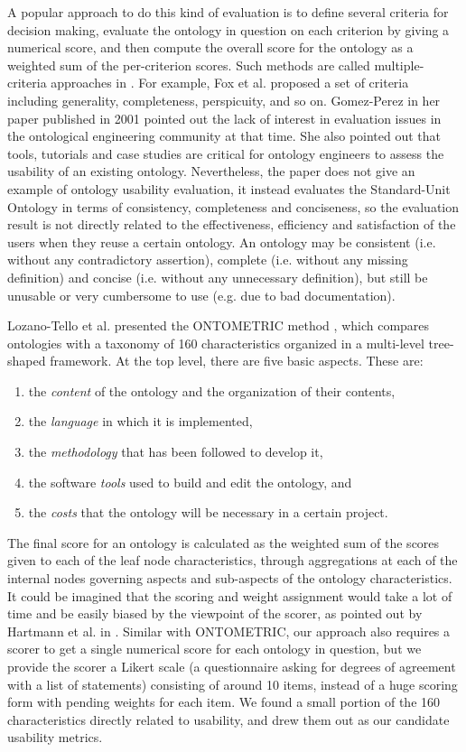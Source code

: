 A popular approach to do this kind of evaluation is to define several criteria for decision making, evaluate the ontology in question on each criterion by giving a numerical score, and then compute the overall score for the ontology as a weighted sum of the per-criterion scores. Such methods are called multiple-criteria approaches in \cite{brank2005survey}. For example, Fox et al. \cite{fox1995organisation} proposed a set of criteria including generality, completeness, perspicuity, and so on. Gomez-Perez in her paper \cite{gomez2001evaluation} published in 2001 pointed out the lack of interest in evaluation issues in the ontological engineering community at that time. She also pointed out that tools, tutorials and case studies are critical for ontology engineers to assess the usability of an existing ontology. Nevertheless, the paper does not give an example of ontology usability evaluation, it instead evaluates the Standard-Unit Ontology in terms of consistency, completeness and conciseness, so the evaluation result is not directly related to the effectiveness, efficiency and satisfaction of the users when they reuse a certain ontology. An ontology may be consistent (i.e. without any contradictory assertion), complete (i.e. without any missing definition) and concise (i.e. without any unnecessary definition), but still be unusable or very cumbersome to use (e.g. due to bad documentation).

Lozano-Tello et al. presented the ONTOMETRIC method \cite{lozano2003selection,lozano2004ontometric}, which compares ontologies with a taxonomy of 160 characteristics organized in a multi-level tree-shaped framework. At the top level, there are five basic aspects. These are: 
\begin{enumerate}
	\item the \emph{content} of the ontology and the
	organization of their contents, 
	\item the \emph{language}
	in which it is implemented, 
	\item the \emph{methodology}
	that has been followed to develop it,
	\item the software \emph{tools} used to build and edit
	the ontology, and 
	\item the \emph{costs} that the ontology
	will be necessary in a certain project.
\end{enumerate}
The final score for an ontology is calculated as the weighted sum of the scores given to each of the leaf node characteristics, through aggregations at each of the internal nodes governing aspects and sub-aspects of the ontology characteristics. It could be imagined that the scoring and weight assignment would take a lot of time and be easily biased by the viewpoint of the scorer, as pointed out by Hartmann et al. in \cite{hartmann2005d1}. Similar with ONTOMETRIC, our approach also requires a scorer to get a single numerical score for each ontology in question, but we provide the scorer a Likert scale (a questionnaire asking for degrees of agreement with a list of statements) consisting of around 10 items, instead of a huge scoring form with pending weights for each item. We found a small portion of the 160 characteristics directly related to usability, and drew them out as our candidate usability metrics.

